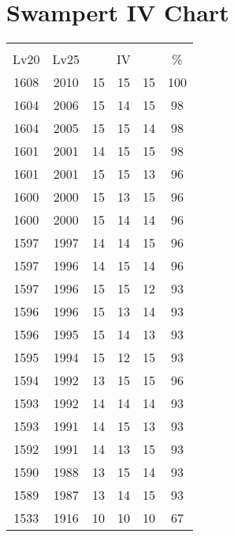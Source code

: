 \documentclass{article}%
\begin{document}
%
\normalsize%
\section{Swampert IV Chart}%
\label{sec:Swampert IV Chart}%
\renewcommand{\arraystretch}{1.5}%
\begin{tabular}{|c|c|c|c|c|c|}%
\hline%
\multicolumn{6}{|c|}{\textcolor{white}{ 
\linebreak{Swampert}
}%
\cellcolor{black}}\\%
\multicolumn{1}{|c}{Lv20}&\multicolumn{1}{c|}{Lv25}&\multicolumn{3}{c|}{IV}&\multicolumn{1}{|c|}{\%}\\%
\hline%
\rowcolor{color100}%
1608&2010&15&15&15&100\\%
\hline%
\rowcolor{color98}%
1604&2006&15&14&15&98\\%
\hline%
\rowcolor{color98}%
1604&2005&15&15&14&98\\%
\hline%
\rowcolor{color98}%
1601&2001&14&15&15&98\\%
\hline%
\rowcolor{color96}%
1601&2001&15&15&13&96\\%
\hline%
\rowcolor{color96}%
1600&2000&15&13&15&96\\%
\hline%
\rowcolor{color96}%
1600&2000&15&14&14&96\\%
\hline%
\rowcolor{color96}%
1597&1997&14&14&15&96\\%
\hline%
\rowcolor{color96}%
1597&1996&14&15&14&96\\%
\hline%
\rowcolor{color93}%
1597&1996&15&15&12&93\\%
\hline%
\rowcolor{color93}%
1596&1996&15&13&14&93\\%
\hline%
\rowcolor{color93}%
1596&1995&15&14&13&93\\%
\hline%
\rowcolor{color93}%
1595&1994&15&12&15&93\\%
\hline%
\rowcolor{color96}%
1594&1992&13&15&15&96\\%
\hline%
\rowcolor{color93}%
1593&1992&14&14&14&93\\%
\hline%
\rowcolor{color93}%
1593&1991&14&15&13&93\\%
\hline%
\rowcolor{color93}%
1592&1991&14&13&15&93\\%
\hline%
\rowcolor{color93}%
1590&1988&13&15&14&93\\%
\hline%
\rowcolor{color93}%
1589&1987&13&14&15&93\\%
\hline%
\rowcolor{color91}%
1533&1916&10&10&10&67\\%
\end{tabular}

%
\end{document}
